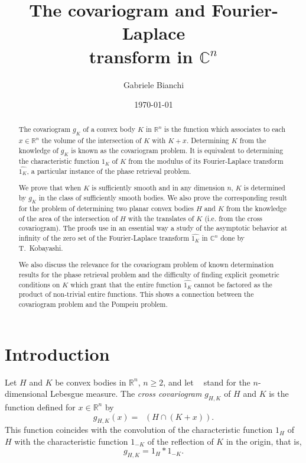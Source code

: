 \documentclass[a4paper]{amsart}
\theoremstyle{definition}
\numberwithin{equation}{section}
\begin{document}
\title[The covariogram  and Fourier-Laplace transform]{The covariogram
and Fourier-Laplace\\ transform in ${\mathbb{C}}^n$}
\author{Gabriele Bianchi}
\address{Dipartimento di Matematica e Informatica, Universit\`a di Firenze, 
Viale Morgagni 67/A, Firenze, Italy I-50134}
\date{\today}

\begin{abstract}
The covariogram $g_{K}$ of a convex body $K$ in ${\mathbb{R}}^n$ is the function which associates to each
$x\in{\mathbb{R}}^n$ the volume of the intersection of $K$ with $K+x$. Determining $K$ from the knowledge of $g_K$ is known as the covariogram problem. It is equivalent to determining the characteristic function $1_K$ of $K$ from the modulus of its Fourier-Laplace transform ${\widehat{{{1_K}}}}$, a particular instance of the phase retrieval problem.

We prove that when $K$ is sufficiently smooth and in any dimension $n$, $K$ is determined by $g_K$ in the class of sufficiently smooth bodies. We also prove the corresponding result for the problem of determining two planar convex bodies $H$ and $K$ from the knowledge of the area of the intersection of $H$ with the translates of $K$ (i.e. from the cross covariogram).
The proofs use in an essential way a study  of the asymptotic behavior at infinity of the zero set  of the Fourier-Laplace  transform ${\widehat{{{1_K}}}}$  in ${\mathbb{C}}^n$ done by T.~Kobayashi.

We also discuss the relevance for the covariogram problem of known determination results for the phase retrieval problem and the difficulty of finding explicit geometric conditions on $K$ which grant that the entire function ${\widehat{{{1_K}}}}$ cannot be factored as the product of non-trivial entire functions. This shows a connection between the covariogram problem and the Pompeiu problem.
\end{abstract}

\maketitle

\section{Introduction}
Let $H$ and $K$ be convex bodies in  ${\mathbb{R}}^n$, $n \geq 2$, and let ${{\mathop{\lambda_n}}}$ stand for the $n$-dimensional Lebesgue measure.
The \emph{cross covariogram} ${g_{{H,K}}}$ of $H$ and $K$ is the
function defined for $x\in{\mathbb{R}}^n$ by
\[
{g_{{H,K}}}(x)={{\mathop{\lambda_n}}}(H\cap (K+x)).
\]
This function coincides with the convolution of  the characteristic function ${1}_H$ of $H$ with the characteristic function ${1}_{-K}$ of the reflection of $K$ in the origin, that is,
\begin{equation}\label{convoluzione}
g_{H,K} ={1}_H\ast {1}_{-K}.
\end{equation}
\end{document}
